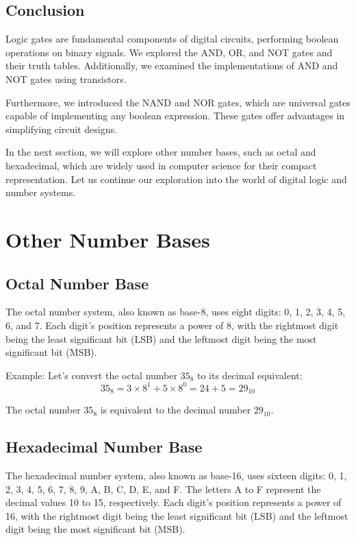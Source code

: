 \documentclass{article}
\begin{document}
\subsection{Conclusion}

Logic gates are fundamental components of digital circuits, performing boolean operations on binary signals. We explored the AND, OR, and NOT gates and their truth tables. Additionally, we examined the implementations of AND and NOT gates using transistors.

Furthermore, we introduced the NAND and NOR gates, which are universal gates capable of implementing any boolean expression. These gates offer advantages in simplifying circuit designs.

In the next section, we will explore other number bases, such as octal and hexadecimal, which are widely used in computer science for their compact representation. Let us continue our exploration into the world of digital logic and number systems.

\newpage

\section{Other Number Bases}

\subsection{Octal Number Base}

The octal number system, also known as base-8, uses eight digits: 0, 1, 2, 3, 4, 5, 6, and 7. Each digit's position represents a power of 8, with the rightmost digit being the least significant bit (LSB) and the leftmost digit being the most significant bit (MSB).

Example: Let's convert the octal number $35_8$ to its decimal equivalent:
\[ 35_8 = 3 \times 8^1 + 5 \times 8^0 = 24 + 5 = 29_{10} \]

The octal number $35_8$ is equivalent to the decimal number $29_{10}$.

\subsection{Hexadecimal Number Base}

The hexadecimal number system, also known as base-16, uses sixteen digits: 0, 1, 2, 3, 4, 5, 6, 7, 8, 9, A, B, C, D, E, and F. The letters A to F represent the decimal values 10 to 15, respectively. Each digit's position represents a power of 16, with the rightmost digit being the least significant bit (LSB) and the leftmost digit being the most significant bit (MSB).
\end{document}
